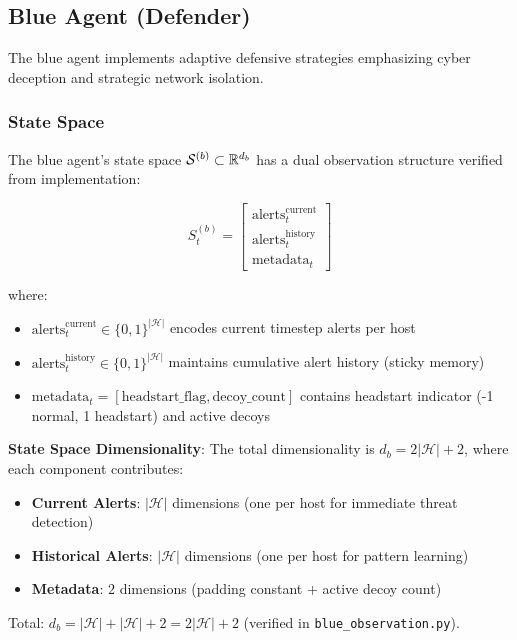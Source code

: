 \documentclass[12pt,oneside,a4paper]{article}
\theoremstyle{definition}
\theoremstyle{plain}
\begin{document}
\subsection{Blue Agent (Defender)}

The blue agent implements adaptive defensive strategies emphasizing cyber deception and strategic network isolation.

\subsubsection{State Space}
The blue agent's state space $\mathcal{S}^{(b)} \subset \mathbb{R}^{d_b}$ has a dual observation structure verified from implementation:

\begin{equation}
S_t^{(b)} = \begin{bmatrix}
\text{alerts}_t^{\text{current}} \\
\text{alerts}_t^{\text{history}} \\
\text{metadata}_t
\end{bmatrix}
\end{equation}

where:
\begin{itemize}
    \item $\text{alerts}_{t}^{\text{current}} \in \{0,1\}^{|\mathcal{H}|}$ encodes current timestep alerts per host
    \item $\text{alerts}_{t}^{\text{history}} \in \{0,1\}^{|\mathcal{H}|}$ maintains cumulative alert history (sticky memory)
    \item $\text{metadata}_t = [\text{headstart\_flag}, \text{decoy\_count}]$ contains headstart indicator (-1 normal, 1 headstart) and active decoys
\end{itemize}

\textbf{State Space Dimensionality}: The total dimensionality is $d_b = 2|\mathcal{H}| + 2$, where each component contributes:

\begin{itemize}
\item \textbf{Current Alerts}: $|\mathcal{H}|$ dimensions (one per host for immediate threat detection)
\item \textbf{Historical Alerts}: $|\mathcal{H}|$ dimensions (one per host for pattern learning)
\item \textbf{Metadata}: $2$ dimensions (padding constant + active decoy count)
\end{itemize}

Total: $d_b = |\mathcal{H}| + |\mathcal{H}| + 2 = 2|\mathcal{H}| + 2$ (verified in \texttt{blue\_observation.py}).
\end{document}
